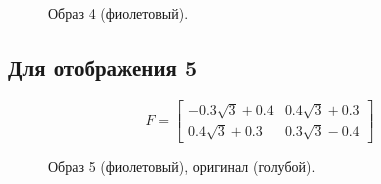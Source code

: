 \documentclass[a5paper, 10pt]{article}
\theoremstyle{definition}
\theoremstyle{plain}
\theoremstyle{remark}
\begin{document}
\begin{figure}[h]
\caption{Образ 4 (фиолетовый).}
\end{figure}


\newpage
\subsection{Для отображения 5}
\begin{equation}
F =
\begin{bmatrix}
-0.3\sqrt{3} + 0.4 & 0.4\sqrt{3} + 0.3 \\
0.4\sqrt{3} + 0.3  & 0.3\sqrt{3} - 0.4 
\end{bmatrix}
\end{equation}

\begin{figure}[h]
\caption{Образ 5 (фиолетовый), оригинал (голубой).}
\end{figure}
\end{document}

